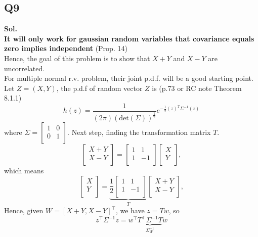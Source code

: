 \documentclass[12pt]{article}
\begin{document}
\subsection*{Q9}
\textbf{Sol.} \\
\textbf{It will only work for gaussian random variables that covariance equals zero implies independent} (Prop. 14)\\  
Hence, the goal of this problem is to show that \(X+Y\) and \(X-Y\) are uncorrelated.\\
For multiple normal r.v. problem, their joint p.d.f. will be a good starting point. 
Let \(Z = (X,Y)\), the p.d.f of random vector \(Z\) is (p.73 or RC note Theorem 8.1.1) 
\[
   h(z) = \frac{1}{(2\pi) (\text{det}(\Sigma) )^{\frac{1}{2}}} e^{-\frac{1}{2} (z)^T \Sigma ^{-1} (z) }
\]  
where \(\Sigma  = \begin{bmatrix}
   1 &  0 \\
   0 &  1 \\
\end{bmatrix}\). 
Next step, finding the transformation matrix \(T\). 
\[
   \begin{bmatrix}
       X+Y \\
       X-Y \\
   \end{bmatrix} = \begin{bmatrix}
      1 &  1 \\
      1 &  -1 \\
   \end{bmatrix} \begin{bmatrix}
       X \\
       Y \\
   \end{bmatrix}, 
\]  
which means 
\[
   \begin{bmatrix}
       X \\
       Y \\
   \end{bmatrix} = \underbrace{\frac{1}{2} \begin{bmatrix}
      1 &  1 \\
      1 &  -1 \\
   \end{bmatrix}}_{T} \begin{bmatrix}
       X+Y \\
       X-Y \\
   \end{bmatrix}, 
\] 
Hence, given \(W = [X+Y,X-Y]^{\top} \), we have \(z = Tw\), so 
\[
   z^{\top} \Sigma^{-1} z = w^{\top} \underbrace{T^{\top} \Sigma^{-1} T}_{\Sigma_W^{-1}} w
\]
\end{document}
